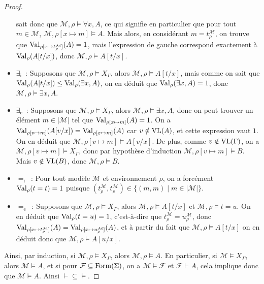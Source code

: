 \begin{proof}
\begin{itemize}
    sait donc que $\mathcal M,\rho\models \forall x, A$, ce qui signifie en
    particulier que pour tout $m\in\mathcal M$,
    $\mathcal M,\rho[x\mapsto m]\models A$.
    Mais alors, en considérant $m = t^\mathcal M_\rho$, on trouve que
    $\operatorname{Val}_{\rho[x\mapsto t^\mathcal M_\rho]}(A) = 1$, mais l'expression de gauche
    correspond exactement à $\operatorname{Val}_\rho(A[t/x])$, donc
    $\mathcal M,\rho\models A[t/x]$.
  \item $\exists_\mathrm i$~: Supposons que $\mathcal M,\rho\models X_\Gamma$,
    alors $\mathcal M,\rho\models A[t/x]$, mais comme on sait que
    $\operatorname{Val}_\rho(A[t/x])\leq\operatorname{Val}_\rho(\exists x,A)$, on en déduit que
    $\operatorname{Val}_\rho(\exists x,A) = 1$, donc $\mathcal M,\rho\models \exists x,A$.
  \item $\exists_\mathrm e$~: Supposons que $\mathcal M,\rho\models X_\Gamma$,
    alors $\mathcal M,\rho\models \exists x,A$, donc on peut trouver un élément
    $m\in|\mathcal M|$ tel que $\operatorname{Val}_{\rho[x\mapsto m]}(A) = 1$. On a
    $\operatorname{Val}_{\rho[v\mapsto m]}(A[v/x]) = \operatorname{Val}_{\rho[x\mapsto m]}(A)$ car
    $v \notin\operatorname{VL}(A)$, et cette expression vaut $1$. On en déduit que
    $\mathcal M,\rho[v\mapsto m]\models A[v/x]$. De plus, comme
    $v\notin\operatorname{VL}(\Gamma)$, on a $\mathcal M,\rho[v\mapsto m]\models X_\Gamma$,
    donc par hypothèse d'induction $\mathcal M,\rho[v\mapsto m]\models B$.
    Mais $v\notin\operatorname{VL}(B)$, donc $\mathcal M,\rho\models B$.
  \item $=_\mathrm i$~: Pour tout modèle $\mathcal M$ et environnement $\rho$, on
    a forcément $\operatorname{Val}_\rho(t=t) = 1$ puisque
    $(t^\mathcal M_\rho,t^\mathcal M_\rho)\in\{(m,m)\mid m\in|\mathcal M|\}$.
  \item $=_\mathrm e$~: Supposons que $\mathcal M,\rho\models X_\Gamma$, alors
    $\mathcal M,\rho\models A[t/x]$ et $\mathcal M,\rho\models t = u$. On en
    déduit que $\operatorname{Val}_\rho(t = u) = 1$, c'est-à-dire que
    $t^\mathcal M_\rho = u^\mathcal M_\rho$, donc
    $\operatorname{Val}_{\rho[x\mapsto t^\mathcal M_\rho]}(A) = \operatorname{Val}_{\rho[x\mapsto u^\mathcal M_\rho]}(A)$,
    et à partir du fait que $\mathcal M,\rho\models A[t/x]$ on en déduit donc
    que $\mathcal M,\rho\models A[u/x]$.
  \end{itemize}

  Ainsi, par induction, si $\mathcal M,\rho\models X_\Gamma$, alors
  $\mathcal M,\rho\models A$. En particulier, si $\mathcal M\models X_\Gamma$,
  alors $\mathcal M\models A$, et si pour
  $\mathcal F\subseteq \operatorname{Form}(\Sigma)$, on a
  $\mathcal M\models \mathcal F$ et $\mathcal F\vdash A$, cela implique donc que
  $\mathcal M\models A$. Ainsi $\vdash\subseteq\vDash$.
\end{proof}

